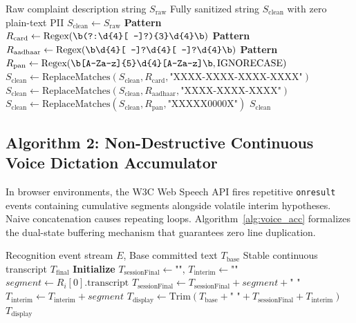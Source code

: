 \begin{algorithm}[h]
\caption{Case-Insensitive DPDP Act 2023 Financial PII Sanitization}
\label{alg:pii_mask}
\begin{algorithmic}[1]
\Require Raw complaint description string $S_{\text{raw}}$
\Ensure Fully sanitized string $S_{\text{clean}}$ with zero plain-text PII
\State $S_{\text{clean}} \gets S_{\text{raw}}$
\State \textbf{Pattern} $R_{\text{card}} \gets \text{Regex}(\verb|\b(?:\d{4}[ -]?){3}\d{4}\b|)$
\State \textbf{Pattern} $R_{\text{aadhaar}} \gets \text{Regex}(\verb|\b\d{4}[ -]?\d{4}[ -]?\d{4}\b|)$
\State \textbf{Pattern} $R_{\text{pan}} \gets \text{Regex}(\verb|\b[A-Za-z]{5}\d{4}[A-Za-z]\b|, \text{IGNORECASE})$
\State $S_{\text{clean}} \gets \text{ReplaceMatches}(S_{\text{clean}}, R_{\text{card}}, \text{"XXXX-XXXX-XXXX-XXXX"})$
\State $S_{\text{clean}} \gets \text{ReplaceMatches}(S_{\text{clean}}, R_{\text{aadhaar}}, \text{"XXXX-XXXX-XXXX"})$
\State $S_{\text{clean}} \gets \text{ReplaceMatches}(S_{\text{clean}}, R_{\text{pan}}, \text{"XXXXX0000X"})$
\State \Return $S_{\text{clean}}$
\end{algorithmic}
\end{algorithm}

\subsection{Algorithm 2: Non-Destructive Continuous Voice Dictation Accumulator}
In browser environments, the W3C Web Speech API fires repetitive \texttt{onresult} events containing cumulative segments alongside volatile interim hypotheses. Naive concatenation causes repeating loops. Algorithm~\ref{alg:voice_acc} formalizes the dual-state buffering mechanism that guarantees zero line duplication.

\begin{algorithm}[h]
\caption{Non-Destructive Continuous Voice Dictation Buffer}
\label{alg:voice_acc}
\begin{algorithmic}[1]
\Require Recognition event stream $E$, Base committed text $T_{\text{base}}$
\Ensure Stable continuous transcript $T_{\text{final}}$
\State \textbf{Initialize} $T_{\text{sessionFinal}} \gets \text{""}$, $T_{\text{interim}} \gets \text{""}$
    \State $segment \gets R_i[0].\text{transcript}$
        \State $T_{\text{sessionFinal}} \gets T_{\text{sessionFinal}} + segment + \text{" "}$
    \Else
        \State $T_{\text{interim}} \gets T_{\text{interim}} + segment$
    \EndIf
\EndFor
\State $T_{\text{display}} \gets \text{Trim}(T_{\text{base}} + \text{" "} + T_{\text{sessionFinal}} + T_{\text{interim}})$
\State \Return $T_{\text{display}}$
\end{algorithmic}
\end{algorithm}

